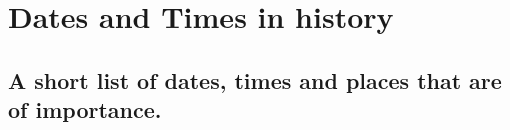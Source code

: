\chapter{Dates and Times in history}
\label{datesnfolk}

\section*{A short list of dates, times and places that are of importance.}



